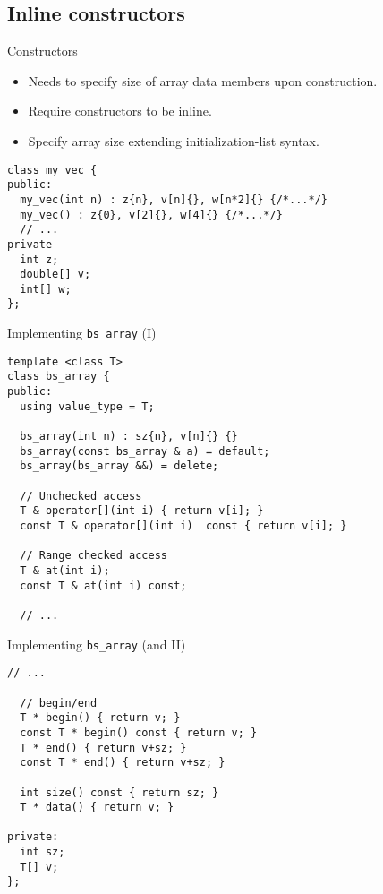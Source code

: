 \subsection{Inline constructors}

\begin{frame}[t,fragile]{Constructors}
\begin{itemize}
  \item Needs to specify size of array data members upon construction.
  \item Require constructors to be inline.
  \item Specify array size extending initialization-list syntax.
\end{itemize}
\begin{lstlisting}[style=cpp11]
class my_vec {
public:
  my_vec(int n) : z{n}, v[n]{}, w[n*2]{} {/*...*/}
  my_vec() : z{0}, v[2]{}, w[4]{} {/*...*/}
  // ...
private
  int z;
  double[] v;
  int[] w;
};
\end{lstlisting}
\end{frame}

\begin{frame}[t,fragile]{Implementing \texttt{bs\_array} (I)}
\begin{lstlisting}[style=cpp11]
template <class T>
class bs_array {
public:
  using value_type = T;

  bs_array(int n) : sz{n}, v[n]{} {}
  bs_array(const bs_array & a) = default;
  bs_array(bs_array &&) = delete;

  // Unchecked access
  T & operator[](int i) { return v[i]; }
  const T & operator[](int i)  const { return v[i]; }

  // Range checked access
  T & at(int i);
  const T & at(int i) const;

  // ...
\end{lstlisting}
\end{frame}

\begin{frame}[t,fragile]{Implementing \texttt{bs\_array} (and II)}
\begin{lstlisting}[style=cpp11]
  // ...

  // begin/end
  T * begin() { return v; }
  const T * begin() const { return v; }
  T * end() { return v+sz; }
  const T * end() { return v+sz; }

  int size() const { return sz; }
  T * data() { return v; }

private:
  int sz;
  T[] v;
};
\end{lstlisting}
\end{frame}

